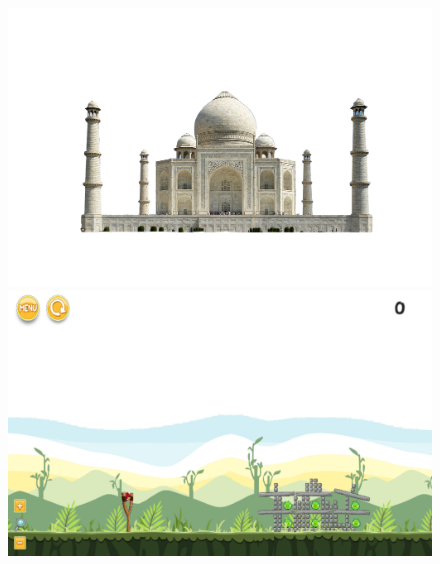 \documentclass{dalthesis}
\begin{document}
\begin{figure}
  \includegraphics[width=\textwidth,height=\textheight,keepaspectratio]{levels/pictures/buildings/taj_mahal.jpg}
  \includegraphics[width=\textwidth,height=\textheight,keepaspectratio]{levels/screenshots/buildings/taj_mahal.png}
\end{figure}
\end{document}
